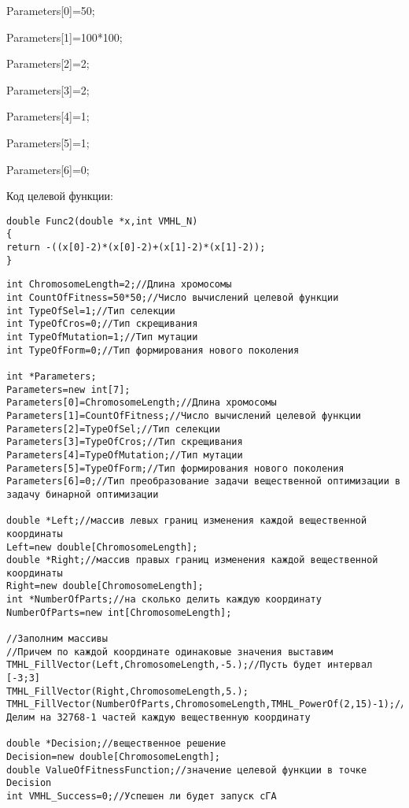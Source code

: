 \documentclass[a4paper,12pt]{article}
\begin{document}
 Parameters[0]=50;
 
Parameters[1]=100*100;

Parameters[2]=2;

Parameters[3]=2;

Parameters[4]=1;

Parameters[5]=1;

Parameters[6]=0;

Код целевой функции:
\begin{lstlisting}[caption=Оптимизируемая функция]
double Func2(double *x,int VMHL_N)
{
return -((x[0]-2)*(x[0]-2)+(x[1]-2)*(x[1]-2));
}
\end{lstlisting}


\begin{lstlisting}[label=code_use_MHL_RealGeneticAlgorithmTwiceGenerations,caption=Пример использования]
int ChromosomeLength=2;//Длина хромосомы
int CountOfFitness=50*50;//Число вычислений целевой функции
int TypeOfSel=1;//Тип селекции
int TypeOfCros=0;//Тип скрещивания
int TypeOfMutation=1;//Тип мутации
int TypeOfForm=0;//Тип формирования нового поколения

int *Parameters;
Parameters=new int[7];
Parameters[0]=ChromosomeLength;//Длина хромосомы
Parameters[1]=CountOfFitness;//Число вычислений целевой функции
Parameters[2]=TypeOfSel;//Тип селекции
Parameters[3]=TypeOfCros;//Тип скрещивания
Parameters[4]=TypeOfMutation;//Тип мутации
Parameters[5]=TypeOfForm;//Тип формирования нового поколения
Parameters[6]=0;//Тип преобразование задачи вещественной оптимизации в задачу бинарной оптимизации

double *Left;//массив левых границ изменения каждой вещественной координаты
Left=new double[ChromosomeLength];
double *Right;//массив правых границ изменения каждой вещественной координаты
Right=new double[ChromosomeLength];
int *NumberOfParts;//на сколько делить каждую координату
NumberOfParts=new int[ChromosomeLength];

//Заполним массивы
//Причем по каждой координате одинаковые значения выставим
TMHL_FillVector(Left,ChromosomeLength,-5.);//Пусть будет интервал [-3;3]
TMHL_FillVector(Right,ChromosomeLength,5.);
TMHL_FillVector(NumberOfParts,ChromosomeLength,TMHL_PowerOf(2,15)-1);//Делим на 32768-1 частей каждую вещественную координату

double *Decision;//вещественное решение
Decision=new double[ChromosomeLength];
double ValueOfFitnessFunction;//значение целевой функции в точке Decision
int VMHL_Success=0;//Успешен ли будет запуск cГА


\end{lstlisting}
\end{document}
